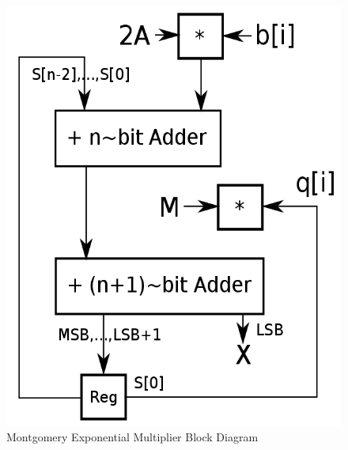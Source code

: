 \documentclass[journal]{IEEEtran}
\begin{document}
	\begin{figure}[h]
		\centering
		\includegraphics[scale=0.2]{pics/Montgomery_exp_mult.png}
		\caption{Montgomery Exponential Multiplier Block Diagram}
	\end{figure}   






%
%
\end{document}
